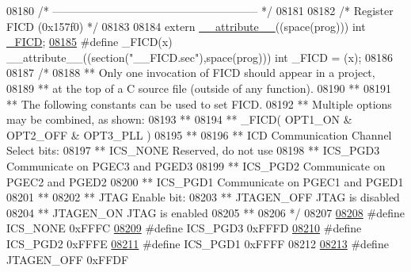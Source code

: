 \begin{DoxyCode}
08180 \textcolor{comment}{/* -------------------------------------------------------- */}
08181 
08182 \textcolor{comment}{/* Register FICD (0x157f0)                               */}
08183 
08184 \textcolor{keyword}{extern} \hyperlink{a00015_a493c46f03454991ccc5aa7a6e1dfb2a7}{\_\_attribute\_\_}((space(prog))) int \hyperlink{a00015_a4d9c4d6bf16ae6027c414d8388c76007}{\_FICD};
\hypertarget{a00015_source_l08185}{}\hyperlink{a00015_a4d9c4d6bf16ae6027c414d8388c76007}{08185} \textcolor{preprocessor}{#define \_FICD(x) \_\_attribute\_\_((section("\_\_FICD.sec"),space(prog))) int \_FICD = (x);}
08186 
08187 \textcolor{comment}{/*}
08188 \textcolor{comment}{** Only one invocation of FICD should appear in a project,}
08189 \textcolor{comment}{** at the top of a C source file (outside of any function).}
08190 \textcolor{comment}{**}
08191 \textcolor{comment}{** The following constants can be used to set FICD.}
08192 \textcolor{comment}{** Multiple options may be combined, as shown:}
08193 \textcolor{comment}{**}
08194 \textcolor{comment}{** \_FICD( OPT1\_ON & OPT2\_OFF & OPT3\_PLL )}
08195 \textcolor{comment}{**}
08196 \textcolor{comment}{**   ICD Communication Channel Select bits:}
08197 \textcolor{comment}{**     ICS\_NONE             Reserved, do not use}
08198 \textcolor{comment}{**     ICS\_PGD3             Communicate on PGEC3 and PGED3}
08199 \textcolor{comment}{**     ICS\_PGD2             Communicate on PGEC2 and PGED2}
08200 \textcolor{comment}{**     ICS\_PGD1             Communicate on PGEC1 and PGED1}
08201 \textcolor{comment}{**}
08202 \textcolor{comment}{**   JTAG Enable bit:}
08203 \textcolor{comment}{**     JTAGEN\_OFF           JTAG is disabled}
08204 \textcolor{comment}{**     JTAGEN\_ON            JTAG is enabled}
08205 \textcolor{comment}{**}
08206 \textcolor{comment}{*/}
08207 
\hypertarget{a00015_source_l08208}{}\hyperlink{a00015_ac6f8547ed8c3128b72d835f2fd8742b1}{08208} \textcolor{preprocessor}{#define ICS\_NONE             0xFFFC}
\hypertarget{a00015_source_l08209}{}\hyperlink{a00015_a3a3eace1cc13292c1e643c1175d68972}{08209} \textcolor{preprocessor}{#define ICS\_PGD3             0xFFFD}
\hypertarget{a00015_source_l08210}{}\hyperlink{a00015_af50582f3e40f65e82a7b29739ee8b9df}{08210} \textcolor{preprocessor}{#define ICS\_PGD2             0xFFFE}
\hypertarget{a00015_source_l08211}{}\hyperlink{a00015_a5ba2dee9be5da4df5baa110e772834c6}{08211} \textcolor{preprocessor}{#define ICS\_PGD1             0xFFFF}
08212 
\hypertarget{a00015_source_l08213}{}\hyperlink{a00015_a75ad63dd6b02e3c6ef56a1a36e796912}{08213} \textcolor{preprocessor}{#define JTAGEN\_OFF           0xFFDF}

\end{DoxyCode}
